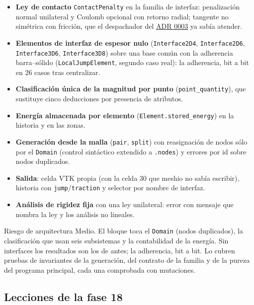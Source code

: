 \documentclass[11pt,oneside]{report}
\begin{document}
\begin{itemize}
  \item \textbf{Ley de contacto} \texttt{ContactPenalty} en la familia de interfaz: penalización normal unilateral y Coulomb opcional con retorno radial; tangente no simétrica con fricción, que el despachador del \hyperref[adr:0003]{ADR 0003} ya sabía atender.
  \item \textbf{Elementos de interfaz de espesor nulo} (\texttt{Interface2D4}, \texttt{Interface2D6}, \texttt{Interface3D6}, \texttt{Interface3D8}) sobre una base común con la adherencia barra--sólido (\texttt{LocalJumpElement}, segundo caso real): la adherencia, bit a bit en 26 casos tras centralizar.
  \item \textbf{Clasificación única de la magnitud por punto} (\texttt{point\_quantity}), que sustituye cinco deducciones por presencia de atributos.
  \item \textbf{Energía almacenada por elemento} (\texttt{Element.\allowbreak{}stored\_\allowbreak{}energy}) en la historia y en las zonas.
  \item \textbf{Generación desde la malla} (\texttt{pair}, \texttt{split}) con reasignación de nodos sólo por el \texttt{Domain} (control sintáctico extendido a \texttt{.nodes}) y errores por id sobre nodos duplicados.
  \item \textbf{Salida}: celda VTK propia (con la celda 30 que meshio no sabía escribir), historia con \texttt{jump}/\texttt{traction} y selector por nombre de interfaz.
  \item \textbf{Análisis de rigidez fija} con una ley unilateral: error con mensaje que nombra la ley y los análisis no lineales.
\end{itemize}

\begin{infobox}{Riesgo de arquitectura}
Medio. El bloque toca el \texttt{Domain} (nodos duplicados), la clasificación que usan seis subsistemas y la contabilidad de la energía. Sin interfaces los resultados son los de antes; la adherencia, bit a bit. Lo cubren pruebas de invariantes de la generación, del contrato de la familia y de la pureza del programa principal, cada una comprobada con mutaciones.
\end{infobox}

\subsection{Lecciones de la fase 18}
\end{document}
